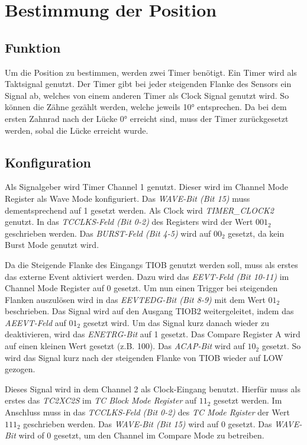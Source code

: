 \documentclass[12pt]{article}
\begin{document}
\section{Bestimmung der Position}

\subsection{Funktion}
Um die Position zu bestimmen, werden zwei Timer benötigt. Ein Timer wird als Taktsignal genutzt.
Der Timer gibt bei jeder steigenden Flanke des Sensors ein Signal ab, welches von einem anderen Timer
als Clock Signal genutzt wird. So können die Zähne gezählt werden, welche jeweils 10° entsprechen.
Da bei dem ersten Zahnrad nach der Lücke 0° erreicht sind, muss der Timer zurückgesetzt werden, sobal die 
Lücke erreicht wurde.

\subsection{Konfiguration}

Als Signalgeber wird Timer Channel 1 genutzt.
Dieser wird im Channel Mode Register als Wave Mode konfiguriert.
Das \textit{WAVE-Bit (Bit 15)} muss dementsprechend auf 1 gesetzt werden.
Als Clock wird \textit{TIMER\_CLOCK2} genutzt. In das \textit{TCCLKS-Feld (Bit 0-2)} des Registers wird der Wert $001_{2}$ geschrieben werden.
Das \textit{BURST-Feld (Bit 4-5)} wird auf $00_{2}$ gesetzt, da kein Burst Mode genutzt wird.

Da die Steigende Flanke des Eingangs TIOB genutzt werden soll, muss als erstes das externe Event aktiviert werden.
Dazu wird das \textit{EEVT-Feld (Bit 10-11)} im Channel Mode Register auf 0 gesetzt.
Um nun einen Trigger bei steigenden Flanken auszulösen wird in das \textit{EEVTEDG-Bit (Bit 8-9)} mit dem Wert $01_2$ beschrieben.
Das Signal wird auf den Ausgang TIOB2 weitergeleitet, indem das \textit{AEEVT-Feld} auf $01_2$ gesetzt wird.
Um das Signal kurz danach wieder zu deaktivieren, wird das \textit{ENETRG-Bit} auf 1 gesetzt.
Das Compare Register A wird auf einen kleinen Wert gesetzt (z.B. 100). Das \textit{ACAP-Bit} wird auf $10_2$ gesetzt. So wird
das Signal kurz nach der steigenden Flanke von TIOB wieder auf LOW gezogen.

Dieses Signal wird in dem Channel 2 als Clock-Eingang benutzt.
Hierfür muss als erstes das \textit{TC2XC2S} im \textit{TC Block Mode Register} auf $11_2$ gesetzt werden.
Im Anschluss muss in das \textit{TCCLKS-Feld (Bit 0-2)} des \textit{TC Mode Rgister} der Wert $111_2$ geschrieben werden.
Das \textit{WAVE-Bit (Bit 15)} wird auf 0 gesetzt. Das \textit{WAVE-Bit} wird of 0 gesetzt, um den Channel im Compare Mode zu betreiben.
\end{document}
